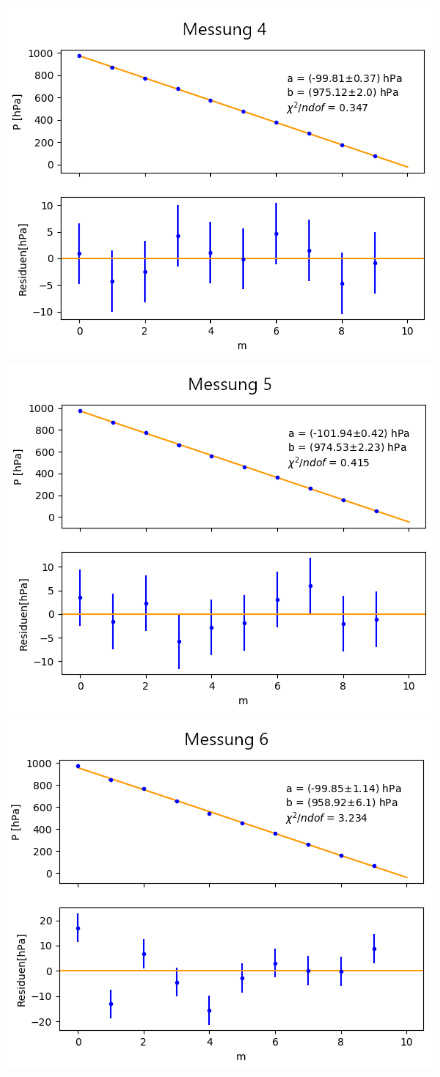 \documentclass[12pt,a4paper]{article}
\begin{document}
\begin{figure}[h]
\includegraphics[scale=0.5]{Bilder/Druck_A_Var2_4.png}
\includegraphics[scale=0.5]{Bilder/Druck_A_Var2_5.png}
\includegraphics[scale=0.5]{Bilder/Druck_A_Var2_6.png}

\end{figure}
\end{document}
